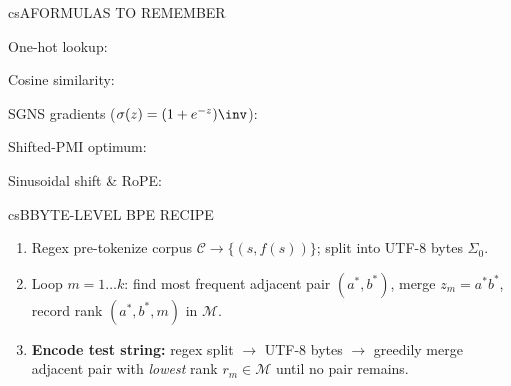 \documentclass[../../../../master.tex]{subfiles}
\begin{document}
\begin{cscolumns}
\begin{cscard}{csA}{FORMULAS TO REMEMBER}
  \begin{csbul}
    \item One-hot lookup:
    \item Cosine similarity:
    \item SGNS gradients ($\sigma(z)=(1+e^{-z})\inv$):
    \item Shifted-PMI optimum:
    \item Sinusoidal shift \& RoPE:
  \end{csbul}
\end{cscard}

\begin{cscard}{csB}{BYTE-LEVEL BPE RECIPE}
  \begin{enumerate}[leftmargin=1.2em, itemsep=1pt, topsep=1pt, parsep=0pt]
    \item Regex pre-tokenize corpus $\mathcal{C}\to\{(s,f(s))\}$; split into UTF-8 bytes $\Sigma_0$.
    \item Loop $m=1\dots k$: find most frequent adjacent pair $(a^*,b^*)$, merge $z_m=a^*b^*$, record rank $(a^*,b^*,m)$ in $\mathcal{M}$.
    \item \textbf{Encode test string:} regex split $\to$ UTF-8 bytes $\to$ greedily merge adjacent pair with \emph{lowest} rank $r_m\in\mathcal{M}$ until no pair remains.
  \end{enumerate}
\end{cscard}
\columnbreak


\end{cscolumns}
\end{document}
